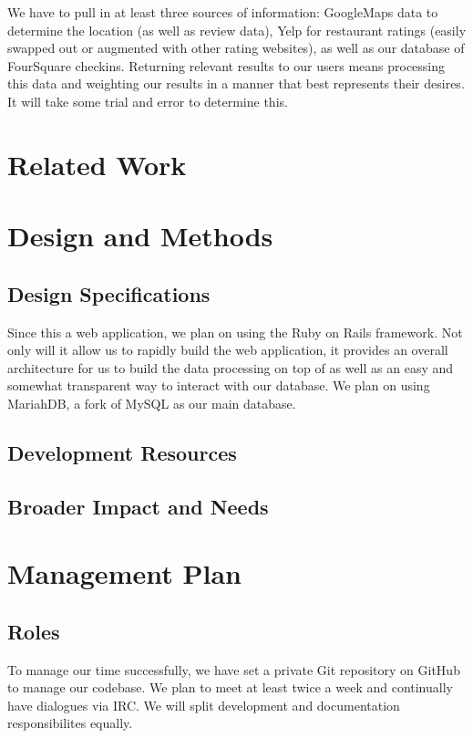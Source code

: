 \documentclass{article}
\begin{document}
We have to pull in at least three sources of information: GoogleMaps data to determine the location (as well as review data), Yelp for restaurant ratings (easily swapped out or augmented with other rating websites), as well as our database of FourSquare checkins. Returning relevant results to our users means processing this data and weighting our results in a manner that best represents their desires. It will take some trial and error to determine this.

\section{Related Work}

\section{Design and Methods}
\subsection{Design Specifications}
Since this a web application, we plan on using the Ruby on Rails framework. Not only will it allow us to rapidly build the web application, it provides an overall architecture for us to build the data processing on top of as well as an easy and somewhat transparent way to interact with our database. We plan on using MariahDB, a fork of MySQL as our main database.

\subsection{Development Resources}

\subsection{Broader Impact and Needs}

\section{Management Plan}
\subsection{Roles}
To manage our time successfully, we have set a private Git repository on GitHub to manage our codebase. 
We plan to meet at least twice a week and continually have dialogues via IRC. We will split development and documentation responsibilites equally.
\end{document}
